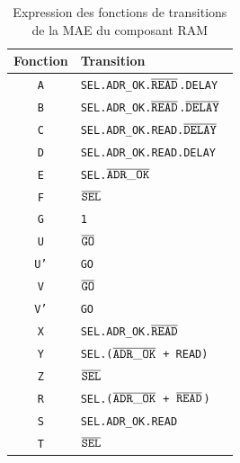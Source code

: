 \documentclass{article}
\begin{document}
\begin{table}[H]
\centering
\begingroup
\setlength{\tabcolsep}{5pt}
\renewcommand{\arraystretch}{1.1}
\begin{tabular}{ | c | l | }
\hline
Fonction    &   Transition  \\
\hline
\texttt{A}  &   \tt{SEL.ADR\_OK.$\overline{\tt{READ}}$.DELAY                     }\\
\texttt{B}  &   \tt{SEL.ADR\_OK.$\overline{\tt{READ}}$.$\overline{\tt{DELAY}}$        }\\
\texttt{C}  &   \tt{SEL.ADR\_OK.READ.$\overline{\tt{DELAY}}$                     }\\
\texttt{D}  &   \tt{SEL.ADR\_OK.READ.DELAY                                  }\\
\texttt{E}  &   \tt{SEL.$\overline{\tt{ADR\_OK}}$                                }\\
\texttt{F}  &   \tt{$\overline{\tt{SEL}}$                                        }\\
\texttt{G}  &   \tt{1                                                       }\\
\hline
\texttt{U}  &   \tt{$\overline{\tt{GO}}$                                         }\\
\texttt{U'} &   \tt{GO                                                      }\\
\hline
\texttt{V}  &   \tt{$\overline{\tt{GO}}$                                         }\\
\texttt{V'} &   \tt{GO                                                      }\\
\hline
\texttt{X}  &   \tt{SEL.ADR\_OK.$\overline{\tt{READ}}$                           }\\
\texttt{Y}  &   \tt{SEL.($\overline{\tt{ADR\_OK}}$ + READ)                       }\\
\texttt{Z}  &   \tt{$\overline{\tt{SEL}}$                                        }\\
\hline
\texttt{R}  &   \tt{SEL.($\overline{\tt{ADR\_OK}}$ + $\overline{\tt{READ}}$)          }\\
\texttt{S}  &   \tt{SEL.ADR\_OK.READ                                        }\\
\texttt{T}  &   \tt{$\overline{\tt{SEL}}$                                        }\\
\hline
\end{tabular}
\endgroup
\caption{Expression des fonctions de transitions de la MAE du composant RAM}
\label{standard}
\end{table}
\end{document}
